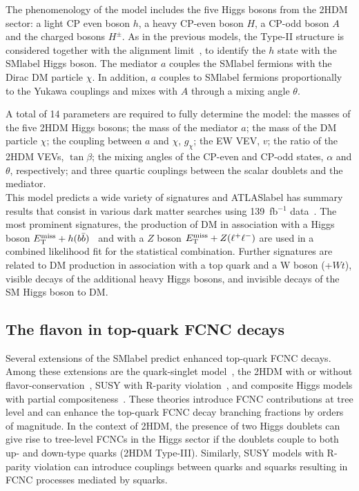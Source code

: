 The phenomenology of the model includes the five Higgs bosons from the 2HDM sector: a light CP even boson $h$, a heavy CP-even boson $H$, a CP-odd boson $A$ and the charged bosons $H^\pm$. As in the previous models, the Type-II structure is considered together with the alignment limit~\cite{Gunion_2003}, to identify the $h$ state with the \acrshort{SMlabel} Higgs boson. The mediator $a$ couples the \acrshort{SMlabel} fermions with the Dirac DM particle $\chi$. In addition, $a$ couples to \acrshort{SMlabel} fermions proportionally to the Yukawa couplings and mixes with $A$ through a mixing angle $\theta$.

A total of 14 parameters are required to fully determine the model: the masses of the five 2HDM Higgs bosons; the mass of the mediator $a$; the mass of the DM particle $\chi$; the coupling between $a$ and $\chi$, $g_\chi$; the \acrshort{EW} \acrshort{VEV}, $v$; the ratio of the 2HDM \acrshort{VEV}s, $\tan\beta$; the mixing angles of the CP-even and CP-odd states, $\alpha$ and $\theta$, respectively; and three quartic couplings between the scalar doublets and the mediator.\\

This model predicts a wide variety of signatures and \acrshort{ATLASlabel} has summary results that consist in various dark matter searches using 139~fb$^{-1}$ data~\cite{Hpluscomb}. The most prominent signatures, the production of DM in association with a Higgs boson $E_{\text{T}}^{\text{miss}}+h(b\bar{b})$~\cite{2108.13391} and with a $Z$ boson $E_{\text{T}}^{\text{miss}}+Z(\ell^+\ell^-)$ are used in a combined likelihood fit for the statistical combination. Further signatures are related to DM production in association with a top quark and a W boson (\MET+$Wt$), visible decays of the additional heavy Higgs bosons, and invisible decays of the SM Higgs boson to DM.\\

\subsection{The flavon in top-quark FCNC decays}

Several extensions of the \acrshort{SMlabel} predict enhanced top-quark FCNC decays. Among these extensions are the quark-singlet model~\cite{PhysRevD.67.035003}, the 2HDM with or without flavor-conservation~\cite{B_jar_2001,GUASCH19993,Cao_2007}, SUSY with R-parity violation~\cite{Eilam_2001}, and composite Higgs models with partial compositeness~\cite{Azatov2014}. These theories introduce FCNC contributions at tree level and can enhance the top-quark FCNC decay branching fractions by orders of magnitude. In the context of 2HDM, the presence of two Higgs doublets can give rise to tree-level FCNCs in the Higgs sector if the doublets couple to both up- and down-type quarks (2HDM Type-III). Similarly, SUSY models with R-parity violation can introduce couplings between quarks and squarks resulting in FCNC processes mediated by squarks.\\

